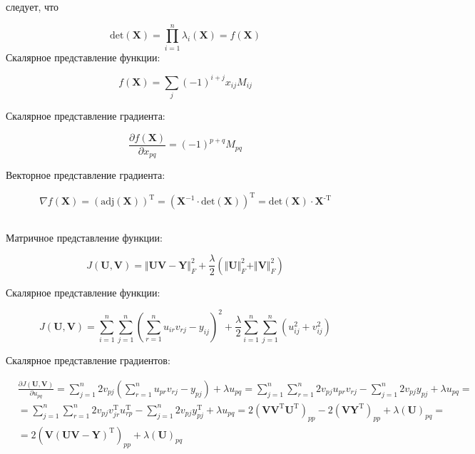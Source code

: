	следует, что 
	
	\begin{equation}
	\text{det} (\mathbf{X} )= \prod\limits_{i=1}^n \lambda_i  (\mathbf{X}) =
	f(\mathbf{X})
	\end{equation}
	Скалярное представление функции:
	
	\begin{equation}
	f(\mathbf{X}) = \sum_j (-1)^{i+j} x_{ij} M_{ij}
	\end{equation}
	
	Скалярное представление градиента:
	
	\begin{equation}
	\frac{\partial f(\mathbf{X}) }{\partial x_{pq}} = (-1)^{p+q}  M_{pq}
	\end{equation}
	
	Векторное представление градиента:
	
	\begin{equation}
	\nabla f(\mathbf{X})  = (\text{adj}(\mathbf{X}))^{\text{T}} =
	(\mathbf{X}^{-1}\cdot \text{det}(\mathbf{X}))^{\text{T}} =
	\text{det}(\mathbf{X}) \cdot\mathbf{X}^{\text{-T}}
	\end{equation}
	
	\subsection{}
	
	Матричное представление функции:
	
	\begin{equation}
	J(\mathbf{U}, \mathbf{V}) = \Vert \mathbf{U} \mathbf{V} - \mathbf{Y} \Vert_F^2
	+ \frac{\lambda}{2}(\Vert \mathbf{U} \Vert_F^2 + \Vert \mathbf{V}\Vert_F^2)
	\end{equation}
	
	Скалярное представление функции:
	
	\begin{equation}
	J(\mathbf{U}, \mathbf{V}) = \sum\limits_{i=1}^{n} \sum\limits_{j=1}^{n}
	(\sum\limits_{r=1}^{n}u_{ir}v_{rj}-y_{ij})^2 +
	\frac{\lambda}{2}\sum\limits_{i=1}^{n} \sum\limits_{j=1}^{n}(u_{ij}^2+v_{ij}^2)
	\end{equation}
	
	Скалярное представление градиентов:
	
	\begin{equation}
	\begin{split}
	&\frac{\partial J(\mathbf{U}, \mathbf{V})}{\partial u_{pq}} =
	\sum\limits_{j=1}^{n}2v_{pj} (\sum\limits_{r=1}^{n}u_{pr}v_{rj}-y_{pj}) +
	\lambda u_{pq} =\sum\limits_{j=1}^{n} \sum\limits_{r=1}^{n} 2v_{pj}
	u_{pr}v_{rj}-\sum\limits_{j=1}^{n} 2v_{pj} y_{pj} + \lambda u_{pq}= \\
	&=\sum\limits_{j=1}^{n} \sum\limits_{r=1}^{n} 2v_{pj}v_{jr}^\text{T}
	u_{rp}^\text{T}-\sum\limits_{j=1}^{n} 2v_{pj} y_{pj}^\text{T} + \lambda u_{pq} =
	2(\mathbf{V}\mathbf{V}^\text{T}\mathbf{U}^\text{T})_{pp} -
	2(\mathbf{V}\mathbf{Y}^\text{T})_{pp} + \lambda (\mathbf{U})_{pq}= \\
	&= 2 (\mathbf{V} (\mathbf{U}\mathbf{V} - \mathbf{Y})^\text{T})_{pp} + \lambda
	(\mathbf{U})_{pq} 
	\end{split}
	\end{equation}
	
